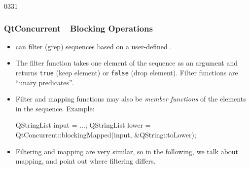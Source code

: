 \begin{slide}[fragile]{0331}
\frametitle{QtConcurrent~\textemdash~Blocking Operations}
  \begin{itemize}
  \item {} can filter (grep) sequences based on a
    user-defined \emph{}.
  \item The filter function takes one element of the sequence as an
    argument and returns \texttt{true} (keep element) or
    \texttt{false} (drop element). Filter functions are ``unary predicates''.
  \item Filter and mapping functions may also be \emph{member
      functions} of the elements in the sequence.
    Example:%
\begin{cpp}
QStringList input = ...;
QStringList lower =
  QtConcurrent::blockingMapped(input, &QString::toLower);
\end{cpp}
  \item Filtering and mapping are very similar, so in the following,
    we talk about mapping, and point out where filtering differs.
  \end{itemize}
\end{slide}
